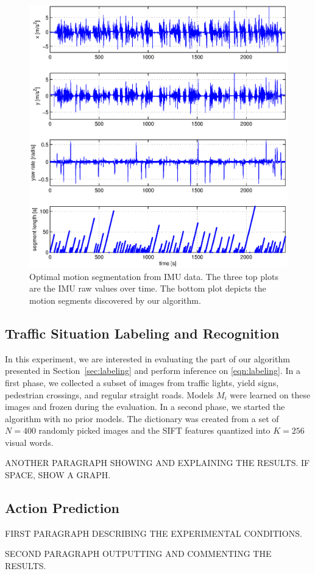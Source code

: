 \begin{figure}[t]
\centering
\includegraphics[width=\columnwidth]{fig/cpResult.eps}
\caption{Optimal motion segmentation from IMU data. The three top plots are the
IMU raw values over time. The bottom plot depicts the motion segments
discovered by our algorithm.}
\label{fig:motion_segments}
\end{figure}

\subsection{Traffic Situation Labeling and Recognition}
In this experiment, we are interested in evaluating the part of our algorithm
presented in Section~\ref{sec:labeling} and perform inference on
\eqref{eqn:labeling}. In a first phase, we collected a subset
of images from traffic lights, yield signs, pedestrian crossings, and regular
straight roads. Models $M_i$ were learned on these images and frozen during the
evaluation. In a second phase, we started the algorithm with no prior models.
The dictionary was created from a set of $N=400$ randomly picked images and the
SIFT features quantized into $K=256$ visual words.

ANOTHER PARAGRAPH SHOWING AND EXPLAINING THE RESULTS. IF SPACE, SHOW A GRAPH.

\subsection{Action Prediction}
FIRST PARAGRAPH DESCRIBING THE EXPERIMENTAL CONDITIONS.

SECOND PARAGRAPH OUTPUTTING AND COMMENTING THE RESULTS.
